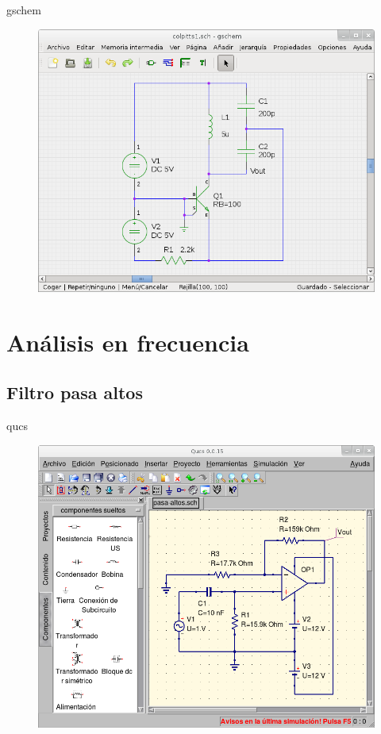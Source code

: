 \documentclass{beamer}
\begin{document}
\begin{frame}{gschem}
  \begin{figure}
    \centering
    \includegraphics[scale=0.4]{geda/img/gschem/gschem-colpitts.png}
  \end{figure}
\end{frame}

\section{Análisis en frecuencia}

\subsection{Filtro pasa altos}

\begin{frame}{qucs}
  \begin{figure}
    \centering
    \includegraphics[scale=0.4]{qucs/img/qucs-pasaltos.png}
  \end{figure}
\end{frame}
\end{document}
